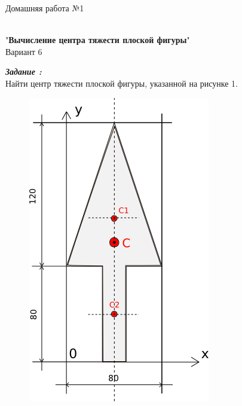 \documentclass[a4paper,11pt]{article}
\begin{document}
 	\begin{center}
 		\begin{Large}
 			Домашняя работа №1
 		\end{Large}
 		\\
 		\medskip
 			"\textbf{Вычисление центра тяжести плоской фигуры}"
 			\\
			\medskip
			Вариант 6
 	\end{center}
 	\begin{flushleft}
	\textbf{\textit{Задание :}}
	\\ 	
 	\hangindent=1.5cm  \noindent
 		Найти центр тяжести плоской фигуры, указанной на рисунке 1.
 	\end{flushleft} 	
 	\begin{figure}[h]
		\begin{center}
			\includegraphics[scale=0.8]{images/final_draw.png}
			\caption{}			
		\end{center}
		\label{model}		
	\end{figure}
\end{document}
